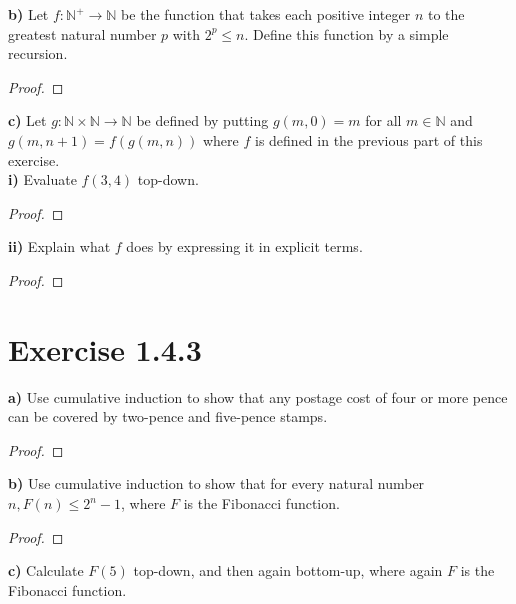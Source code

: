 \documentclass[titlepage, letterpaper, fleqn]{article}
\newcommand{\spacepls}{\vspace{5mm}}
\begin{document}
\spacepls

{\large \textbf{b)} Let \(f \colon \mathbb{N}^+ \to \mathbb{N}\) be  the function that takes each positive integer \(n\) to the greatest natural number \(p\) with \(2^p \leq n\). Define this function by a simple recursion.}

\begin{proof}
\lipsum[1]
\end{proof}

\spacepls


{\large \textbf{c)} Let \(g \colon \mathbb{N} \times \mathbb{N} \to \mathbb{N}\) be defined by putting \(g(m,0) = m\) for all \(m \in \mathbb{N}\) and \(g(m,n+1) = f(g(m,n))\) where \(f\) is defined in the previous part of this exercise.}\\
\textbf{i)} Evaluate \(f(3,4)\) top-down.

\begin{proof}
\lipsum[1]
\end{proof}

\spacepls

\textbf{ii)} Explain what \(f\) does by expressing it in explicit terms.

\begin{proof}
\lipsum[1]
\end{proof}

\section{Exercise 1.4.3}

{\large \textbf{a)} Use cumulative induction to show that any postage cost of four or more pence can be covered by two-pence and five-pence stamps.}

\begin{proof}
\lipsum[1]
\end{proof}

\spacepls

{\large \textbf{b)} Use cumulative induction to show that for every natural number \(n, F(n) \leq 2^n - 1\), where \(F\) is the Fibonacci function.}

\begin{proof}
\lipsum[1]
\end{proof}

\spacepls

{\large \textbf{c)} Calculate \(F(5)\) top-down, and then again bottom-up, where again \(F\) is the Fibonacci function.}
\end{document}

